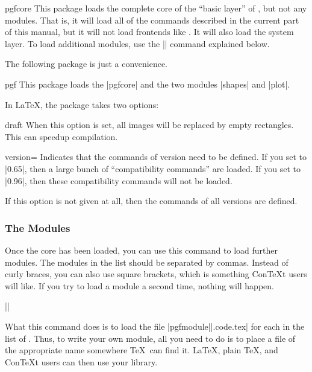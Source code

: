 \begin{package}{pgfcore}
    This package loads the complete core of the ``basic layer'' of \pgfname,
    but not any modules. That is, it will load all of the commands described in
    the current part of this manual, but it will not load frontends like
    \tikzname. It will also load the system layer. To load additional modules,
    use the |\usepgfmodule| command explained below.
\end{package}

The following package is just a convenience.

\begin{package}{pgf}
    This package loads the |pgfcore| and the two modules |shapes| and |plot|.

    In \LaTeX, the package takes two options:
    \begin{packageoption}{draft}
        When this option is set, all images will be replaced by empty
        rectangles. This can speedup compilation.
    \end{packageoption}

    \begin{packageoption}{version=}
        Indicates that the commands of version  need to be
        defined. If you set  to |0.65|, then a large bunch of
        ``compatibility commands'' are loaded. If you set  to
        |0.96|, then these compatibility commands will not be loaded.

        If this option is not given at all, then the commands of all versions
        are defined.
    \end{packageoption}
\end{package}


\subsubsection{The Modules}

\begin{command}{\usepgflibrary{}}
    Once the core has been loaded, you can use this command to load further
    modules. The modules in the  list should be separated by
    commas. Instead of curly braces, you can also use square brackets, which is
    something Con\TeX t users will like. If you try to load a module a second
    time, nothing will happen.

    \example ||

    What this command does is to load the file
    |pgfmodule||.code.tex| for each  in the list of
    . Thus, to write your own module, all you need to do is
    to place a file of the appropriate name somewhere \TeX\ can find it.
    \LaTeX, plain \TeX, and Con\TeX t users can then use your library.
\end{command}


